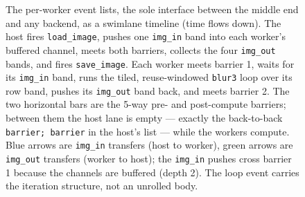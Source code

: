 \begin{figure}[tbp]
{}
  \caption[Per-worker event lists of the stencil]{The per-worker event lists, the
    sole interface between the middle end and any backend, as a swimlane
    timeline (time flows down). The host fires \texttt{load\_image}, pushes one
    \texttt{img\_in} band into each worker's buffered channel, meets both
    barriers, collects the four \texttt{img\_out} bands, and fires
    \texttt{save\_image}. Each worker meets barrier 1, waits for its
    \texttt{img\_in} band, runs the tiled, reuse-windowed \texttt{blur3} loop over
    its row band, pushes its \texttt{img\_out} band back, and meets barrier 2. The
    two horizontal bars are the 5-way pre- and post-compute barriers; between them
    the host lane is empty --- exactly the back-to-back \texttt{barrier; barrier}
    in the host's list --- while the workers compute. Blue arrows are
    \texttt{img\_in} transfers (host to worker), green arrows are
    \texttt{img\_out} transfers (worker to host); the \texttt{img\_in} pushes
    cross barrier 1 because the channels are buffered (depth 2). The loop event
    carries the iteration structure, not an unrolled body.}
  \label{fig:wt-events}
\end{figure}
